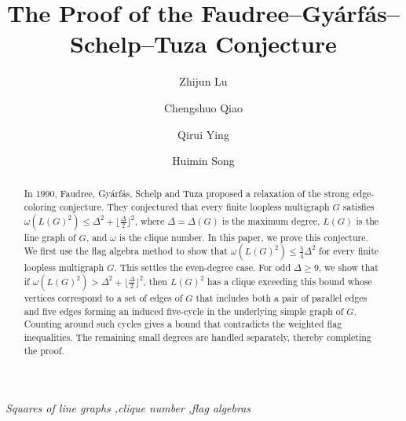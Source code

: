 \documentclass[preprint,11pt,numbers]{elsarticle-arxiv}
\numberwithin{equation}{section}
\theoremstyle{definition}
\newcommand{\papertitle}{The Proof of the Faudree--Gy\'arf\'as--Schelp--Tuza Conjecture}
\begin{document}

\begin{frontmatter}
\title{\textbf{\Large\papertitle}}
\author[1]{Zhijun Lu}
\author[1]{Chengshuo Qiao}
\author[1]{Qirui Ying}
\author[1]{Huimin Song}

\begin{abstract}
In 1990, Faudree, Gy\'arf\'as, Schelp and Tuza proposed a relaxation
of the strong edge-coloring conjecture. They conjectured that every
finite loopless multigraph $G$ satisfies
$\omega(L(G)^2)\leq\Delta^2+\lfloor\frac{\Delta}{2}\rfloor^2$, where
$\Delta=\Delta(G)$ is the maximum degree, $L(G)$ is the line graph
of $G$, and $\omega$ is the clique number. In this paper, we prove this conjecture. We first use the flag algebra
method to show that $\omega(L(G)^2)\leq\frac{5}{4}\Delta^2$ for every
finite loopless multigraph $G$. This settles the even-degree case.
For odd $\Delta\geq 9$, we show that if
$\omega(L(G)^2)>\Delta^2+\lfloor\frac{\Delta}{2}\rfloor^2$,
then $L(G)^2$ has a clique exceeding this bound whose vertices
correspond to a set of edges of $G$ that includes both a pair of
parallel edges and five edges forming an induced five-cycle in the
underlying simple graph of $G$. Counting around such cycles gives a
bound that contradicts the weighted flag inequalities. The remaining
small degrees are handled separately, thereby completing the proof.
\end{abstract}
\begin{keyword}
\textit{Squares of line graphs \sep clique number \sep flag algebras}
\end{keyword}
\end{frontmatter}

\thispagestyle{plain}
\tableofcontents
\clearpage








\begingroup
\small
\setlength{\bibsep}{3pt plus .3pt minus .3pt}
{}

\endgroup
\end{document}
